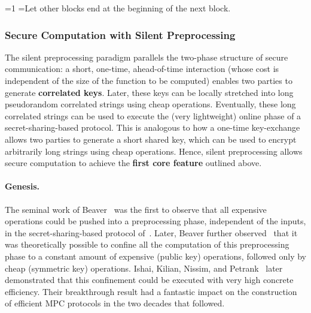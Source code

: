 \documentclass[oneside, a4paper, onecolumn, 11pt]{article}
\newcounter{alphasect}
\def\alphainsection{0}
\newenvironment{alphasection}{%
  \ifnum\alphainsection=1%
    \errhelp={Let other blocks end at the beginning of the next block.}
    \errmessage{Nested Alpha section not allowed}
  \fi%
  \setcounter{alphasect}{0}
  \def\alphainsection{1}
}{%
  \setcounter{alphasect}{0}
  \def\alphainsection{0}
}%
\begin{document}
\begin{alphasection}
\subsubsection{Secure Computation with Silent Preprocessing}
\label{subsub:silent}
The silent preprocessing paradigm parallels the two-phase structure of secure communication: a short, one-time, ahead-of-time interaction (whose cost is independent of the size of the function to be computed) enables two parties to generate \textbf{correlated keys}. Later, these keys can be locally stretched into long pseudorandom correlated strings using cheap operations. Eventually, these long correlated strings can be used to execute the (very lightweight) online phase of a secret-sharing-based protocol. This is analogous to how a one-time key-exchange allows two parties to generate a short shared key, which can be used to encrypt arbitrarily long strings using cheap operations. Hence, silent preprocessing allows secure computation to achieve the \textbf{first core feature} outlined above.

\paragraph{Genesis.} The seminal work of Beaver~\cite{C:Beaver91b,C:Beaver95} was the first to observe that all expensive operations could be pushed into a preprocessing phase, independent of the inputs, in the secret-sharing-based protocol of~\cite{C:GolMicWig86}. Later, Beaver further observed~\cite{STOC:Beaver96a} that it was theoretically possible to confine all the computation of this preprocessing phase to a constant amount of expensive (public key) operations, followed only by cheap (symmetric key) operations. Ishai, Kilian, Nissim, and Petrank~\cite{C:IKNP03} later demonstrated that this confinement could be executed with very high concrete efficiency. Their breakthrough result had a fantastic impact on the construction of efficient MPC protocols in the two decades that followed.


\end{alphasection}
\end{document}
